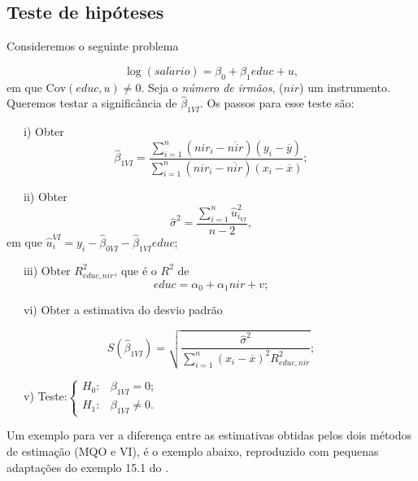 \documentclass[
]{book}
\theoremstyle{definition}
\theoremstyle{definition}
\theoremstyle{definition}
\theoremstyle{remark}
\begin{document}
\hypertarget{teste-de-hipuxf3teses}{%
\subsection{Teste de hipóteses}\label{teste-de-hipuxf3teses}}

Consideremos o seguinte problema

\begin{equation}
 \log(sal\acute{a}rio)=\beta_0+\beta_1 educ+u,
 \label{eq:thlogsal}
\end{equation}
em que \(\mbox{Cov}(educ,u)\neq 0\). Seja o \emph{número de irmãos}, (\(nir\)) um instrumento.
Queremos testar a significância de \(\hat{\beta}_{1VI}\). Os passos para esse teste são:

~~~i) Obter \[\hat{\beta}_{1VI}=\frac{\sum_{i=1}^{n}(nir_i-\overline{nir})(y_i-\overline{y})}              {\sum_{i=1}^{n}(nir_i-\overline{nir})(x_i-\overline{x})};\]

~~~ii) Obter \[\hat{\sigma}^2=\frac{\sum_{i=1}^{n}{\hat{u}^{2}_{i_{VI}}}}{n-2}, \] em que \(\hat{u}_i^{VI}=y_i-\hat{\beta}_{0VI}-\hat{\beta}_{1VI}educ\);

~~~iii) Obter \(R^2_{educ,nir}\), que é o \(R^2\) de \[educ=\alpha_0+\alpha_1nir+v;\]

~~~vi) Obter a estimativa do desvio padrão

\[S(\hat{\beta}_{1VI})=\sqrt{\frac{\hat{\sigma}^2}{\sum_{i=1}^{n}(x_i-\overline{x})^2R^2_{educ,nir}}};\]

~~~v) Teste:\(\begin{cases} H_0: & \beta_{1VI}=0; \\ H_1: & \beta_{1VI}\neq 0. \end{cases}\)

Um exemplo para ver a diferença entre as estimativas obtidas pelos dois métodos de estimação (MQO e VI), é o exemplo abaixo, reproduzido com pequenas adaptações do exemplo 15.1 do \citet{wooldridge2016}.
\end{document}
